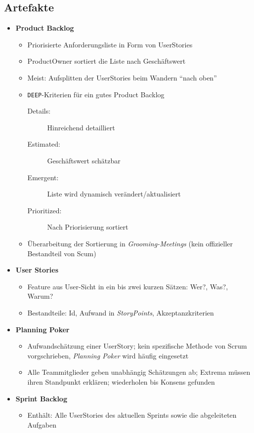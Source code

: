 \subsection{Artefakte}
\begin{itemize}
	\item \textbf{Product Backlog}
	\begin{itemize}
		\item Priorisierte Anforderungsliste in Form von UserStories
		\item ProductOwner sortiert die Liste nach Geschäftswert
		\item Meist: Aufsplitten der UserStories beim Wandern "`nach oben"'
		\item \texttt{DEEP}-Kriterien für ein gutes Product Backlog
		\begin{description}
			\item[Details:] Hinreichend detailliert
			\item[Estimated:] Geschäftswert schätzbar
			\item[Emergent:] Liste wird dynamisch verändert/aktualisiert
			\item[Prioritized:] Nach Priorisierung sortiert
		\end{description}
		\item Überarbeitung der Sortierung in \textit{Grooming-Meetings} (kein offizieller Bestandteil von Scum)
	\end{itemize}
	\item \textbf{User Stories}
	\begin{itemize}
		\item Feature aus User-Sicht in ein bis zwei kurzen Sätzen: Wer?, Was?, Warum?
		\item Bestandteile: Id, Aufwand in \textit{StoryPoints}, Akzeptanzkriterien
	\end{itemize}
	\item \textbf{Planning Poker}
	\begin{itemize}
		\item Aufwandschätzung einer UserStory; kein spezifische Methode von Scrum vorgschrieben, \textit{Planning Poker} wird häufig eingesetzt
		\item Alle Teammitglieder geben unabhängig Schätzungen ab; Extrema müssen ihren Standpunkt erklären; wiederholen bis Konsens gefunden
	\end{itemize}
	\item \textbf{Sprint Backlog}
	\begin{itemize}
		\item Enthält: Alle UserStories des aktuellen Sprints sowie die abgeleiteten Aufgaben

\end{itemize}
\end{itemize}
